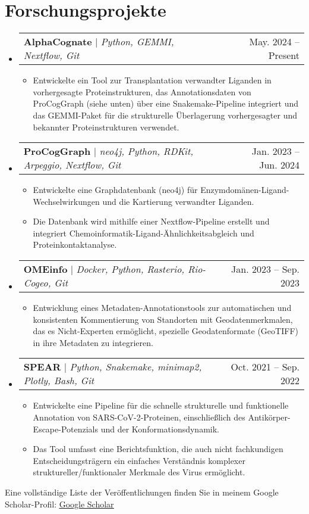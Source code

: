 \documentclass[a4paper,11pt]{article}
\makeatletter
\newcommand{\resumeItem}[1]{
  \item\small{
    {#1 \vspace{-2pt}}
  }
}
\newcommand{\resumeProjectHeading}[2]{
    \item
    \begin{tabular*}{0.97\textwidth}{l@{\extracolsep{\fill}}r}
      \small#1 & #2 \\
    \end{tabular*}\vspace{-7pt}
}
\newcommand{\resumeSubHeadingListStart}{\begin{itemize}[leftmargin=0.15in, label={}]}
\newcommand{\resumeSubHeadingListEnd}{\end{itemize}}
\newcommand{\resumeItemListStart}{\begin{itemize}}
\newcommand{\resumeItemListEnd}{\end{itemize}\vspace{-5pt}}
\makeatother
\begin{document}
\section{Forschungsprojekte}
    \resumeSubHeadingListStart
      \resumeProjectHeading
        {\textbf{AlphaCognate} $|$ \emph{Python, GEMMI, Nextflow, Git}}{May. 2024 -- Present}
        \resumeItemListStart
          \resumeItem{Entwickelte ein Tool zur Transplantation verwandter Liganden in vorhergesagte Proteinstrukturen, das Annotationsdaten von ProCogGraph (siehe unten) über eine Snakemake-Pipeline integriert und das GEMMI-Paket für die strukturelle Überlagerung vorhergesagter und bekannter Proteinstrukturen verwendet.}
        \resumeItemListEnd
      \resumeProjectHeading
          {\textbf{ProCogGraph} $|$ \emph{neo4j, Python, RDKit, Arpeggio, Nextflow, Git}}{Jan. 2023 -- Jun. 2024}
          \resumeItemListStart
            \resumeItem{Entwickelte eine Graphdatenbank (neo4j) für Enzymdomänen-Ligand-Wechselwirkungen und die Kartierung verwandter Liganden.}
            \resumeItem{Die Datenbank wird mithilfe einer Nextflow-Pipeline erstellt und integriert Chemoinformatik-Ligand-Ähnlichkeitsabgleich und Proteinkontaktanalyse.}
          \resumeItemListEnd
      \resumeProjectHeading
          {\textbf{OMEinfo} $|$ \emph{Docker, Python, Rasterio, Rio-Cogeo, Git}}{Jan. 2023 -- Sep. 2023}
          \resumeItemListStart
            \resumeItem{Entwicklung eines Metadaten-Annotationstools zur automatischen und konsistenten Kommentierung von Standorten mit Geodatenmerkmalen, das es Nicht-Experten ermöglicht, spezielle Geodatenformate (GeoTIFF) in ihre Metadaten zu integrieren.}
          \resumeItemListEnd
      \resumeProjectHeading
          {\textbf{SPEAR} $|$ \emph{Python, Snakemake, minimap2, Plotly, Bash, Git}}{Oct. 2021 -- Sep. 2022}
          \resumeItemListStart
            \resumeItem{Entwickelte eine Pipeline für die schnelle strukturelle und funktionelle Annotation von SARS-CoV-2-Proteinen, einschließlich des Antikörper-Escape-Potenzials und der Konformationsdynamik.}
            \resumeItem{Das Tool umfasst eine Berichtsfunktion, die auch nicht fachkundigen Entscheidungsträgern ein einfaches Verständnis komplexer struktureller/funktionaler Merkmale des Virus ermöglicht.}
          \resumeItemListEnd
    \resumeSubHeadingListEnd
    Eine vollständige Liste der Veröffentlichungen finden Sie in meinem Google Scholar-Profil: \href{https://scholar.google.com/citations?user=b8OKEYcAAAAJ&hl=en&oi=ao}{\underline{Google Scholar}}


%
\end{document}
